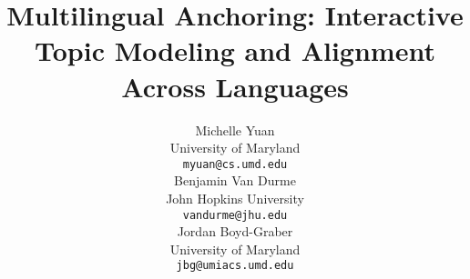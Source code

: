\documentclass{article}
\title{Multilingual Anchoring: Interactive Topic Modeling and Alignment  Across Languages}
\author{
	Michelle Yuan \\
	University of Maryland\\
	{\tt myuan@cs.umd.edu} \\\And
	Benjamin Van Durme \\
	John Hopkins University \\
	{\tt vandurme@jhu.edu} \\\And
	Jordan Boyd-Graber \\
	University of Maryland \\
	{\tt jbg@umiacs.umd.edu} \\
}
\begin{document}
\maketitle

\begin{abstract}
 	
\end{abstract}
%








\nocite{hao-2018}
\nocite{nguyen-2014}



\end{document}
